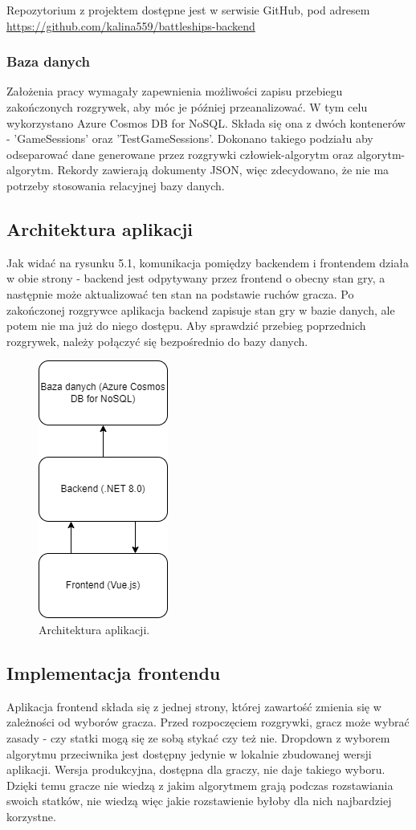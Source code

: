 Repozytorium z projektem dostępne jest w serwisie GitHub, pod adresem \url{https://github.com/kalina559/battleships-backend}
\subsubsection{Baza danych}

Założenia pracy wymagały zapewnienia możliwości zapisu przebiegu zakończonych rozgrywek, aby móc je później przeanalizować. W tym celu wykorzystano Azure Cosmos DB for NoSQL. Składa się ona z dwóch kontenerów - 'GameSessions' oraz 'TestGameSessions'. Dokonano takiego podziału aby odseparować dane generowane przez rozgrywki człowiek-algorytm oraz algorytm-algorytm. Rekordy zawierają dokumenty JSON, więc zdecydowano, że nie ma potrzeby stosowania relacyjnej bazy danych.

\subsection{Architektura aplikacji}

Jak widać na rysunku 5.1, komunikacja pomiędzy backendem i frontendem działa w obie strony - backend jest odpytywany przez frontend o obecny stan gry, a następnie może aktualizować ten stan na podstawie ruchów gracza. Po zakończonej rozgrywce aplikacja backend zapisuje stan gry w bazie danych, ale potem nie ma już do niego dostępu. Aby sprawdzić przebieg poprzednich rozgrywek, należy połączyć się bezpośrednio do bazy danych.

\begin{figure}[!h]
    \label{fig:architektura}
    \centering \includegraphics[width=0.2\linewidth]{img/architecture.drawio.png}
    \caption{Architektura aplikacji.}
\end{figure}

\subsection{Implementacja frontendu}
\indent Aplikacja frontend składa się z jednej strony, której zawartość zmienia się w zależności od wyborów gracza. Przed rozpoczęciem rozgrywki, gracz może wybrać zasady - czy statki mogą się ze sobą stykać czy też nie. Dropdown z wyborem algorytmu przeciwnika jest dostępny jedynie w lokalnie zbudowanej wersji aplikacji. Wersja produkcyjna, dostępna dla graczy, nie daje takiego wyboru. Dzięki temu gracze nie wiedzą z jakim algorytmem grają podczas rozstawiania swoich statków, nie wiedzą więc jakie rozstawienie byłoby dla nich najbardziej korzystne.

